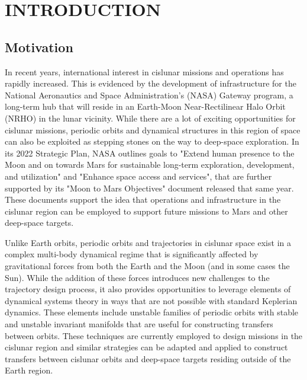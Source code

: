 \chapter{INTRODUCTION}
\section{Motivation}
In recent years, international interest in cislunar missions and operations has rapidly increased.
This is evidenced by the development of infrastructure for the National Aeronautics and Space
Administration's (NASA) Gateway program, a long-term hub that will reside in an Earth-Moon
Near-Rectilinear Halo Orbit (NRHO) in the lunar vicinity\cite{Zamora:2024}. While there are a lot
of exciting opportunities for cislunar missions, periodic orbits and dynamical structures in this
region of space can also be exploited as stepping stones on the way to deep-space exploration. In
its 2022 Strategic Plan, NASA outlines goals to "Extend human presence to the Moon and on towards
Mars for sustainable long-term exploration, development, and utilization" and "Enhance space access
and services"\cite{NASA:2022s}, that are further supported by its "Moon to Mars Objectives"
document released that same year\cite{NASA:2022m}. These documents support the idea that operations
and infrastructure in the cislunar region can be employed to support future missions to Mars and
other deep-space targets.

Unlike Earth orbits, periodic orbits and trajectories in cislunar space exist in a complex
multi-body dynamical regime that is significantly affected by gravitational forces from both the
Earth and the Moon (and in some cases the Sun). While the addition of these forces introduces new
challenges to the trajectory design process, it also provides opportunities to leverage elements of
dynamical systems theory in ways that are not possible with standard Keplerian dynamics. These
elements include unstable families of periodic orbits with stable and unstable invariant manifolds
that are useful for constructing transfers between orbits. These techniques are currently employed
to design missions in the cislunar region and similar strategies can be adapted and applied to
construct transfers between cislunar orbits and deep-space targets residing outside of the Earth
region.

